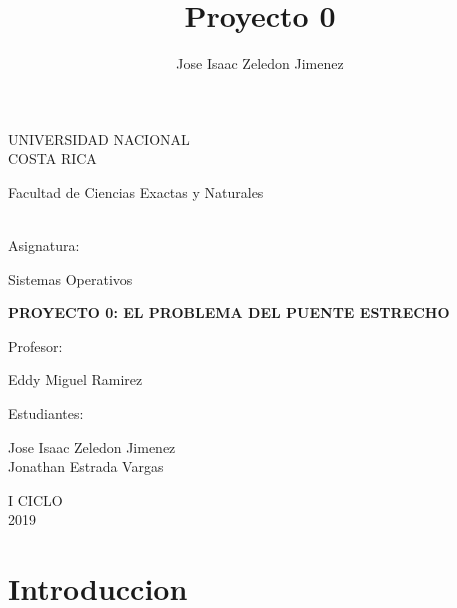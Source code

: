 \documentclass[10pt,a4paper]{article}
\author{Jose Isaac Zeledon Jimenez }
\title{Proyecto 0}
\begin{document}
\begin{titlepage}
\begin{center}
\begin{large}
UNIVERSIDAD NACIONAL\\
COSTA RICA \\
\end{large}
\vspace*{1cm}
\begin{large}
Facultad de Ciencias Exactas y Naturales
\end{large} 
\vspace*{1.8cm}\\
Asignatura:\\
\vspace*{2mm}
\begin{large}
Sistemas Operativos\\
\end{large}
\vspace*{12mm}
\begin{large}
\textbf{PROYECTO 0: 
EL PROBLEMA DEL PUENTE ESTRECHO
}\\
\end{large}
\vspace*{1.8cm}
Profesor:\\
\vspace*{5mm}
\begin{large}
Eddy Miguel Ramirez\\
\end{large}
\vspace*{1.8cm}
Estudiantes: \\
\vspace*{5mm}
\begin{large}
Jose Isaac Zeledon Jimenez\\
Jonathan Estrada Vargas\\
\end{large}
\vspace*{1.8cm}
I CICLO\\
\vspace*{1.8cm}
2019
\end{center}
\end{titlepage}
\section{Introduccion}
\section{}
\end{document}
